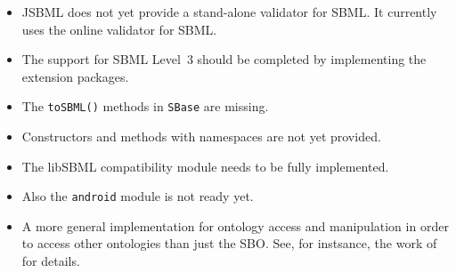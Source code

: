 \begin{itemize}
\item JSBML does not yet provide a stand-alone validator for SBML. It currently
uses the online validator for SBML.
\item The support for SBML Level~3 should be completed by
implementing the extension packages.
\item The \texttt{toSBML()}
methods in \texttt{SBase} are missing.
\item Constructors and methods with namespaces are not yet provided.
\item The libSBML compatibility module
needs to be fully implemented.
\item Also the \texttt{android} module is not ready yet.
\item A more general implementation for ontology access and manipulation in
order to access other ontologies than just the SBO. See, for instsance, the work
of \citet{Courtot2011a} for details.
\end{itemize}

